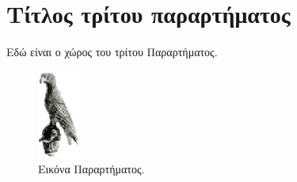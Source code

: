 \chapter{Τίτλος τρίτου παραρτήματος}
\label{app:ThirdAppendix}
\minitoc

Εδώ είναι ο χώρος του τρίτου Παραρτήματος.

\begin{figure}[h]
	\centering
	\includegraphics[width=0.125\textwidth]{Figures/bird.eps}
	\caption{Εικόνα Παραρτήματος.}
	\label{fig:AppendixFigure}
\end{figure}